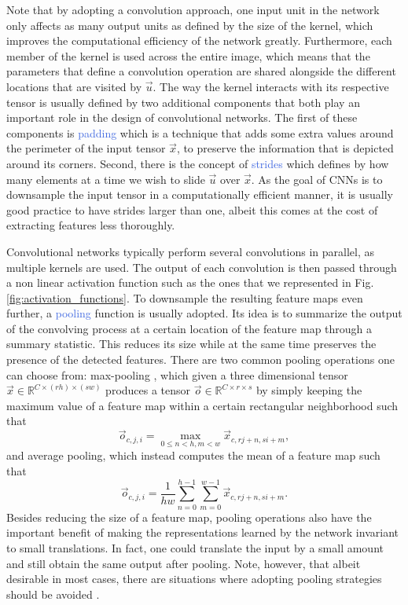 Note that by adopting a convolution approach, one input unit in the network only affects as many output units as defined by the size of the kernel, which improves the computational efficiency of the network greatly. Furthermore, each member of the kernel is used across the entire image, which means that the parameters that define a convolution operation are shared alongside the different locations that are visited by $\vec{u}$. The way the kernel interacts with its respective tensor is usually defined by two additional components that both play an important role in the design of convolutional networks. The first of these components is \textcolor{RoyalBlue}{padding} which is a technique that adds some extra values around the perimeter of the input tensor $\vec{x}$, to preserve the information that is depicted around its corners. Second, there is the concept of \textcolor{RoyalBlue}{strides} which defines by how many elements at a time we wish to slide $\vec{u}$ over $\vec{x}$. As the goal of CNNs is to downsample the input tensor in a computationally efficient manner, it is usually good practice to have strides larger than one, albeit this comes at the cost of extracting features less thoroughly. 

Convolutional networks typically perform several convolutions in parallel, as multiple kernels are used. The output of each convolution is then passed through a non linear activation function such as the ones that we represented in Fig. \ref{fig:activation_functions}. To downsample the resulting feature maps even further, a \textcolor{RoyalBlue}{pooling} function is usually adopted. Its idea is to summarize the output of the convolving process at a certain location of the feature map through a summary statistic. This reduces its size while at the same time preserves the presence of the detected features. There are two common pooling operations one can choose from: max-pooling \cite{zhou1988computation}, which given a three dimensional tensor $\vec{x}\in\mathds{R}^{C\times(rh)\times(sw)}$ produces a tensor $\vec{o}\in\mathds{R}^{C\times r\times s}$ by simply keeping the maximum value of a feature map within a certain rectangular neighborhood such that 
\begin{equation}
	\vec{o}_{c,j,i} = \underset{0\leq n<h,m<w}{\max} \vec{x}_{c,rj+n,si+m},
\end{equation}
and average pooling, which instead computes the mean of a feature map such that 
\begin{equation}
	\vec{o}_{c,j,i} = \frac{1}{hw} \sum_{n=0}^{h-1}\sum_{m=0}^{w-1} \vec{x}_{c,rj+n,si+m}.
\end{equation}
Besides reducing the size of a feature map, pooling operations also have the important benefit of making the representations learned by the network invariant to small translations. In fact, one could translate the input by a small amount and still obtain the same output after pooling. Note, however, that albeit desirable in most cases, there are situations where adopting pooling strategies should be avoided \cite{sabatelli2018learning, bidoiadeep}.  


